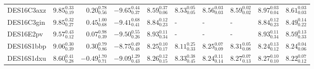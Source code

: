 \documentclass[fleqn,usenatbib,]{mnras}
\begin{document}
\begin{table}
\begin{threeparttable}
\begin{tabular}{lrrrllllll}
DES16C3axz  &   $9.85 _{\scriptscriptstyle 0.19} ^{\scriptscriptstyle 0.33}$ &   $0.20 _{\scriptscriptstyle 0.56} ^{\scriptscriptstyle 0.78}$ &   $-9.65 _{\scriptscriptstyle 0.37} ^{\scriptscriptstyle 0.44}$ &  $8.59 _{\scriptscriptstyle 0.06} ^{\scriptscriptstyle 0.37}$ &  $8.53 _{\scriptscriptstyle 0.05} ^{\scriptscriptstyle 0.05}$ &  $8.56 _{\scriptscriptstyle 0.03} ^{\scriptscriptstyle 0.03}$ &  $8.59 _{\scriptscriptstyle 0.02} ^{\scriptscriptstyle 0.02}$ &  $8.97 _{\scriptscriptstyle 0.04} ^{\scriptscriptstyle 0.03}$ &  $8.61 _{\scriptscriptstyle 0.03} ^{\scriptscriptstyle 0.03}$ \\
DES16C3gin  &   $9.85 _{\scriptscriptstyle 0.27} ^{\scriptscriptstyle 0.32}$ &   $0.45 _{\scriptscriptstyle 0.68} ^{\scriptscriptstyle 1.00}$ &   $-9.41 _{\scriptscriptstyle 0.41} ^{\scriptscriptstyle 0.68}$ &  $8.84 _{\scriptscriptstyle 0.23} ^{\scriptscriptstyle 0.12}$ &                                                             - &                                                             - &                                                             - &  $8.84 _{\scriptscriptstyle 0.23} ^{\scriptscriptstyle 0.12}$ &  $8.49 _{\scriptscriptstyle 0.22} ^{\scriptscriptstyle 0.14}$ \\
DES16E2pv   &   $9.57 _{\scriptscriptstyle 0.12} ^{\scriptscriptstyle 0.43}$ &   $0.07 _{\scriptscriptstyle 0.39} ^{\scriptscriptstyle 0.98}$ &   $-9.50 _{\scriptscriptstyle 0.26} ^{\scriptscriptstyle 0.55}$ &  $8.93 _{\scriptscriptstyle 0.34} ^{\scriptscriptstyle 0.11}$ &                                                             - &                                                             - &                                                             - &  $8.93 _{\scriptscriptstyle 0.34} ^{\scriptscriptstyle 0.11}$ &  $8.59 _{\scriptscriptstyle 0.33} ^{\scriptscriptstyle 0.13}$ \\
DES16S1bbp  &   $9.06 _{\scriptscriptstyle 0.39} ^{\scriptscriptstyle 0.30}$ &   $0.30 _{\scriptscriptstyle 0.86} ^{\scriptscriptstyle 0.79}$ &   $-8.75 _{\scriptscriptstyle 0.48} ^{\scriptscriptstyle 0.49}$ &  $8.25 _{\scriptscriptstyle 0.17} ^{\scriptscriptstyle 0.10}$ &  $8.11 _{\scriptscriptstyle 0.33} ^{\scriptscriptstyle 0.25}$ &  $8.25 _{\scriptscriptstyle 0.09} ^{\scriptscriptstyle 0.07}$ &  $8.31 _{\scriptscriptstyle 0.08} ^{\scriptscriptstyle 0.05}$ &  $8.24 _{\scriptscriptstyle 0.12} ^{\scriptscriptstyle 0.13}$ &  $8.24 _{\scriptscriptstyle 0.06} ^{\scriptscriptstyle 0.04}$ \\
DES16S1dxu  &   $8.60 _{\scriptscriptstyle 0.28} ^{\scriptscriptstyle 0.41}$ &  $-0.49 _{\scriptscriptstyle 0.71} ^{\scriptscriptstyle 1.70}$ &   $-9.09 _{\scriptscriptstyle 0.43} ^{\scriptscriptstyle 1.29}$ &  $8.26 _{\scriptscriptstyle 0.15} ^{\scriptscriptstyle 0.12}$ &  $8.33 _{\scriptscriptstyle 0.45} ^{\scriptscriptstyle 0.38}$ &  $8.24 _{\scriptscriptstyle 0.14} ^{\scriptscriptstyle 0.11}$ &  $8.27 _{\scriptscriptstyle 0.13} ^{\scriptscriptstyle 0.07}$ &  $8.27 _{\scriptscriptstyle 0.10} ^{\scriptscriptstyle 0.10}$ &  $8.22 _{\scriptscriptstyle 0.12} ^{\scriptscriptstyle 0.07}$ \\

\end{tabular}
\end{threeparttable}
\end{table}
\end{document}
